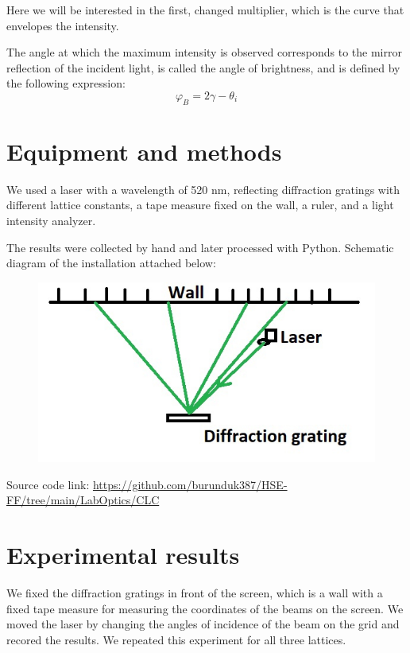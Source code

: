 \documentclass[a4paper, 12pt]{article}
\renewcommand{\phi}{\varphi} %
\begin{document}
	Here we will be interested in the first, changed multiplier, which is the curve that envelopes the intensity.
	
	The angle at which the maximum intensity is observed corresponds to the mirror reflection of the incident light, is called the angle of brightness, and is defined by the following expression:
	\begin{equation}
		\phi_B = 2\gamma - \theta_i
	\end{equation}
	
	
	\section*{Equipment and methods}
	We used a laser with a wavelength of 520 nm, reflecting diffraction gratings with different lattice constants, a tape measure fixed on the wall, a ruler, and a light intensity analyzer.
	
	The results were collected by hand and later processed with Python. Schematic diagram of the installation attached below:
	\begin{figure}[H]
		\centering
		\includegraphics[width=0.85\linewidth]{sch1.jpg}
		\caption{}
		\label{fig:3}
	\end{figure}
	Source code link: \href{https://github.com/burunduk387/HSE-FF/tree/main/LabOptics/CLC}{https://github.com/burunduk387/HSE-FF/tree/main/LabOptics/CLC}
	\section*{Experimental results}
	We fixed the diffraction gratings in front of the screen, which is a wall with a fixed tape measure for measuring the coordinates of the beams on the screen. We moved the laser by changing the angles of incidence of the beam on the grid and recored the results. We repeated this experiment for all three lattices.
\end{document}
